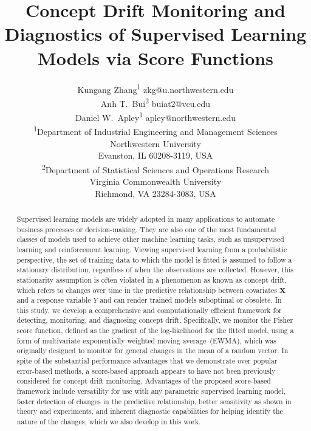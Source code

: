 \documentclass[twoside,11pt]{article}
\begin{document}
\title{Concept Drift Monitoring and Diagnostics of Supervised Learning Models via Score Functions}

\author{\name Kungang Zhang\textsuperscript{1} \email zkg@u.northwestern.edu \\
	\name Anh T.\ Bui\textsuperscript{2} \email buiat2@vcu.edu \\
	\name Daniel W.\ Apley\textsuperscript{1} \email apley@northwestern.edu \\
       \addr \textsuperscript{1}Department of Industrial Engineering and Management Sciences\\
       Northwestern University\\
       Evanston, IL 60208-3119, USA\\
       \textsuperscript{2}Department of Statistical Sciences and Operations Research\\ 
       Virginia Commonwealth University\\
       Richmond, VA 23284-3083, USA}

\maketitle

\begin{abstract}%
Supervised learning models are widely adopted in many applications to automate business processes or decision-making. They are also one of the most fundamental classes of models used to achieve other machine learning tasks, such as unsupervised learning and reinforcement learning. Viewing supervised learning from a probabilistic perspective, the set of training data to which the model is fitted is assumed to follow a stationary distribution, regardless of when the observations are collected. However, this stationarity assumption is often violated in a phenomenon as known as concept drift, which refers to changes over time in the predictive relationship between covariates $\bm{X}$ and a response variable $Y$ and can render trained models suboptimal or obsolete. In this study, we develop a comprehensive and computationally efficient framework for detecting, monitoring, and diagnosing concept drift. Specifically, we monitor the Fisher score function, defined as the gradient of the log-likelihood for the fitted model, using a form of multivariate exponentially weighted moving average~(EWMA), which was originally designed to monitor for general changes in the mean of a random vector. In spite of the substantial performance advantages that we demonstrate over popular error-based methods, a score-based approach appears to have not been previously considered for concept drift monitoring. Advantages of the proposed score-based framework include versatility for use with any parametric supervised learning model, faster detection of changes in the predictive relationship, better sensitivity as shown in theory and experiments, and inherent diagnostic capabilities for helping identify the nature of the changes, which we also develop in this work.
\end{abstract}
\end{document}
